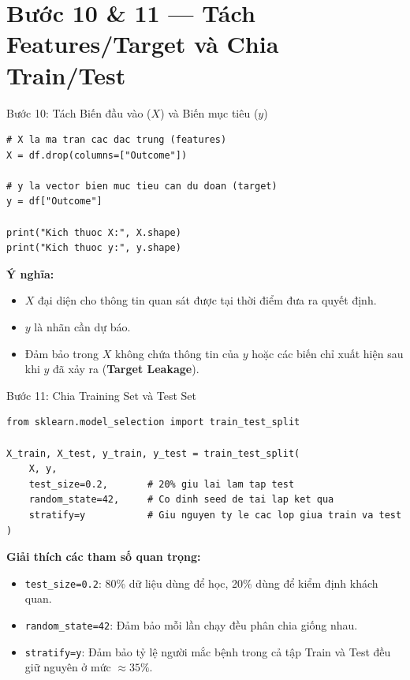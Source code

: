 \documentclass[aspectratio=169,11pt]{beamer}
\newcommand{\code}[1]{\texttt{#1}}
\newcommand{\smallgap}{\vspace{0.35em}}
\begin{document}
\section{Bước 10 \& 11 — Tách Features/Target và Chia Train/Test}

\begin{frame}[fragile]{Bước 10: Tách Biến đầu vào ($X$) và Biến mục tiêu ($y$)}
\begin{lstlisting}[style=pythonstyle]
# X la ma tran cac dac trung (features)
X = df.drop(columns=["Outcome"])

# y la vector bien muc tieu can du doan (target)
y = df["Outcome"]

print("Kich thuoc X:", X.shape)
print("Kich thuoc y:", y.shape)
\end{lstlisting}

\smallgap
\textbf{Ý nghĩa:}
\begin{itemize}
  \item $X$ đại diện cho thông tin quan sát được tại thời điểm đưa ra quyết định.
  \item $y$ là nhãn cần dự báo.
  \item Đảm bảo trong $X$ không chứa thông tin của $y$ hoặc các biến chỉ xuất hiện sau khi $y$ đã xảy ra (\textbf{Target Leakage}).
\end{itemize}
\end{frame}

\begin{frame}[fragile]{Bước 11: Chia Training Set và Test Set}
\begin{lstlisting}[style=pythonstyle]
from sklearn.model_selection import train_test_split

X_train, X_test, y_train, y_test = train_test_split(
    X, y,
    test_size=0.2,       # 20% giu lai lam tap test
    random_state=42,     # Co dinh seed de tai lap ket qua
    stratify=y           # Giu nguyen ty le cac lop giua train va test
)
\end{lstlisting}

\smallgap
\textbf{Giải thích các tham số quan trọng:}
\begin{itemize}
  \item \code{test\_size=0.2}: 80\% dữ liệu dùng để học, 20\% dùng để kiểm định khách quan.
  \item \code{random\_state=42}: Đảm bảo mỗi lần chạy đều phân chia giống nhau.
  \item \code{stratify=y}: Đảm bảo tỷ lệ người mắc bệnh trong cả tập Train và Test đều giữ nguyên ở mức $\approx 35\%$.
\end{itemize}
\end{frame}
\end{document}

